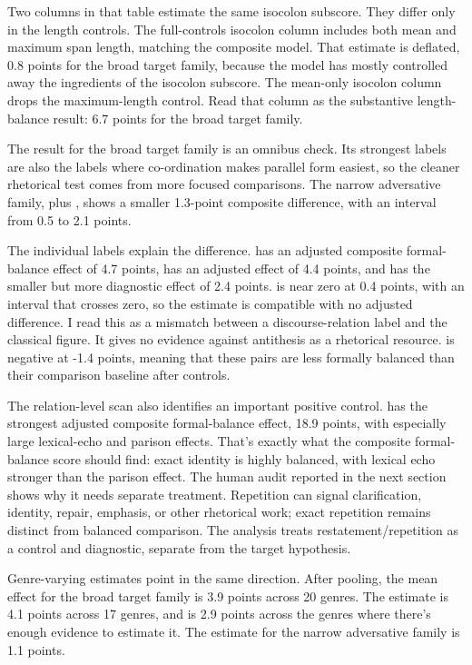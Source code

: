 \documentclass[12pt]{article}
\begin{document}
Two columns in that table estimate the same isocolon subscore. They differ
only in the length controls. The full-controls isocolon column includes
both mean and maximum span length, matching the composite model. That
estimate is deflated, 0.8 points for the broad target family, because the
model has mostly controlled away the ingredients of the isocolon subscore.
The mean-only isocolon column drops the maximum-length control. Read that
column as the substantive length-balance result: 6.7 points for the broad
target family.

The result for the broad target family is an omnibus check. Its strongest labels are also
the labels where co-ordination makes parallel form easiest, so the cleaner
rhetorical test comes from more focused comparisons. The narrow adversative
family,  plus
, shows a smaller 1.3-point composite
difference, with an interval from 0.5 to 2.1 points.

The individual labels explain the difference.
 has an adjusted composite formal-balance effect of
4.7 points,  has an adjusted effect of 4.4 points, and
 has the smaller but more diagnostic
effect of 2.4 points.
 is near zero at 0.4 points, with an
interval that crosses zero, so the estimate is compatible with no adjusted
difference. I read this as a mismatch between a
discourse-relation label and the classical figure. It gives no evidence
against antithesis as a rhetorical resource.
 is negative at -1.4 points, meaning that
these pairs are less formally balanced than their comparison baseline after
controls.

The relation-level scan also identifies an important positive control.
 has the strongest adjusted composite
formal-balance effect, 18.9 points, with especially large lexical-echo and
parison effects. That's exactly what the composite formal-balance score
should find: exact identity is highly balanced, with lexical echo stronger
than the parison effect. The human audit reported in the next section shows
why it needs separate treatment.
Repetition can signal clarification, identity, repair, emphasis, or other
rhetorical work; exact repetition remains distinct from balanced
comparison. The analysis treats restatement/repetition as a control
and diagnostic, separate from the target hypothesis.

Genre-varying estimates point in the same direction. After pooling, the mean
effect for the broad target family is 3.9 points across 20 genres. The
 estimate is 4.1 points across 17 genres, and
 is 2.9 points across the genres where
there's enough evidence to estimate it. The estimate for the narrow
adversative family is 1.1 points.
\end{document}
